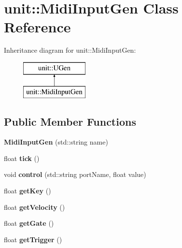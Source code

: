 \hypertarget{classunit_1_1MidiInputGen}{}\section{unit\+:\+:Midi\+Input\+Gen Class Reference}
\label{classunit_1_1MidiInputGen}
Inheritance diagram for unit\+:\+:Midi\+Input\+Gen\+:\begin{figure}[H]
\begin{center}
\leavevmode
\includegraphics[height=2.000000cm]{classunit_1_1MidiInputGen}
\end{center}
\end{figure}
\subsection*{Public Member Functions}
\begin{DoxyCompactItemize}
\item 
{\bfseries Midi\+Input\+Gen} (std\+::string name)\hypertarget{classunit_1_1MidiInputGen_a48063ea203958867e649466152ccebd8}{}\label{classunit_1_1MidiInputGen_a48063ea203958867e649466152ccebd8}

\item 
float {\bfseries tick} ()\hypertarget{classunit_1_1MidiInputGen_a4633d43acd7810f80ebc3ac343ba7dd3}{}\label{classunit_1_1MidiInputGen_a4633d43acd7810f80ebc3ac343ba7dd3}

\item 
void {\bfseries control} (std\+::string port\+Name, float value)\hypertarget{classunit_1_1MidiInputGen_a97db1d2b3deac8d7dd09fce65bfdca04}{}\label{classunit_1_1MidiInputGen_a97db1d2b3deac8d7dd09fce65bfdca04}

\item 
float {\bfseries get\+Key} ()\hypertarget{classunit_1_1MidiInputGen_aa180744b692b2ac4f8f5d11ef2adc245}{}\label{classunit_1_1MidiInputGen_aa180744b692b2ac4f8f5d11ef2adc245}

\item 
float {\bfseries get\+Velocity} ()\hypertarget{classunit_1_1MidiInputGen_a4e39971e955b7052df07dd9413075fc0}{}\label{classunit_1_1MidiInputGen_a4e39971e955b7052df07dd9413075fc0}

\item 
float {\bfseries get\+Gate} ()\hypertarget{classunit_1_1MidiInputGen_a9bfcd695b0dd9a3c3b0ca8cddadd9432}{}\label{classunit_1_1MidiInputGen_a9bfcd695b0dd9a3c3b0ca8cddadd9432}

\item 
float {\bfseries get\+Trigger} ()\hypertarget{classunit_1_1MidiInputGen_a4db32a60d580040a10d3b0acad2c30e3}{}\label{classunit_1_1MidiInputGen_a4db32a60d580040a10d3b0acad2c30e3}

\end{DoxyCompactItemize}
